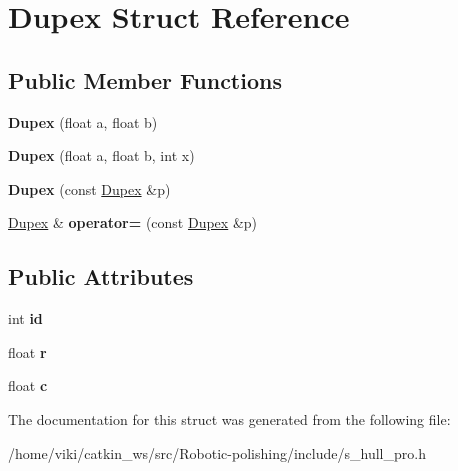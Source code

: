 \hypertarget{structDupex}{}\section{Dupex Struct Reference}
\label{structDupex}
\subsection*{Public Member Functions}
\begin{DoxyCompactItemize}
\item 
{\bfseries Dupex} (float a, float b)\hypertarget{structDupex_aaed3c2075f61e455fc5489ac9c51e412}{}\label{structDupex_aaed3c2075f61e455fc5489ac9c51e412}

\item 
{\bfseries Dupex} (float a, float b, int x)\hypertarget{structDupex_a675d9bb8fdcd1781d22fa526f8207a65}{}\label{structDupex_a675d9bb8fdcd1781d22fa526f8207a65}

\item 
{\bfseries Dupex} (const \hyperlink{structDupex}{Dupex} \&p)\hypertarget{structDupex_a14516ba394b02dd7ed903cc925ab774a}{}\label{structDupex_a14516ba394b02dd7ed903cc925ab774a}

\item 
\hyperlink{structDupex}{Dupex} \& {\bfseries operator=} (const \hyperlink{structDupex}{Dupex} \&p)\hypertarget{structDupex_acf5ed9f42cadbcc18d2e08436864ca7e}{}\label{structDupex_acf5ed9f42cadbcc18d2e08436864ca7e}

\end{DoxyCompactItemize}
\subsection*{Public Attributes}
\begin{DoxyCompactItemize}
\item 
int {\bfseries id}\hypertarget{structDupex_a6d3f3fb43fe87a08c9eac943a02936fa}{}\label{structDupex_a6d3f3fb43fe87a08c9eac943a02936fa}

\item 
float {\bfseries r}\hypertarget{structDupex_a7e929bba43edb950a24f217a363aabf8}{}\label{structDupex_a7e929bba43edb950a24f217a363aabf8}

\item 
float {\bfseries c}\hypertarget{structDupex_a43c2bcfdee6ea28dd123dee6d2eb5190}{}\label{structDupex_a43c2bcfdee6ea28dd123dee6d2eb5190}

\end{DoxyCompactItemize}


The documentation for this struct was generated from the following file\+:\begin{DoxyCompactItemize}
\item 
/home/viki/catkin\+\_\+ws/src/\+Robotic-\/polishing/include/s\+\_\+hull\+\_\+pro.\+h\end{DoxyCompactItemize}
